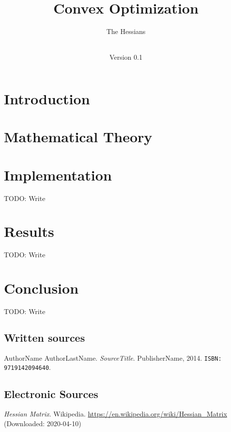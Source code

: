 \documentclass[notitlepage]{article}
\title{Convex Optimization\\}
\author{The Hessians}
\date{\documentdate\\Version 0.1} %
\begin{document}
\maketitle
\projectidentity
\authors

\newpage
\tableofcontents

\newpage
\listoffigures
{} 

\listoftables
{}

\newpage
{}

\section{Introduction}

\newpage

\section{Mathematical Theory}

\newpage

\section{Implementation}
TODO: Write
\newpage

\section{Results}
TODO: Write
\newpage

\section{Conclusion}
TODO: Write
\newpage

\begin{thebibliography}{9}
	\subsection*{Written sources}
	AuthorName AuthorLastName.
	\textit{SourceTitle}.
	PublisherName, 2014.
	\texttt{ISBN: 9719142094640}.
	
	\subsection*{Electronic Sources}
	\textit{Hessian Matrix}.
	Wikipedia.
	\url{https://en.wikipedia.org/wiki/Hessian_Matrix} (Downloaded: 2020-04-10)

\end{thebibliography}
\end{document}
